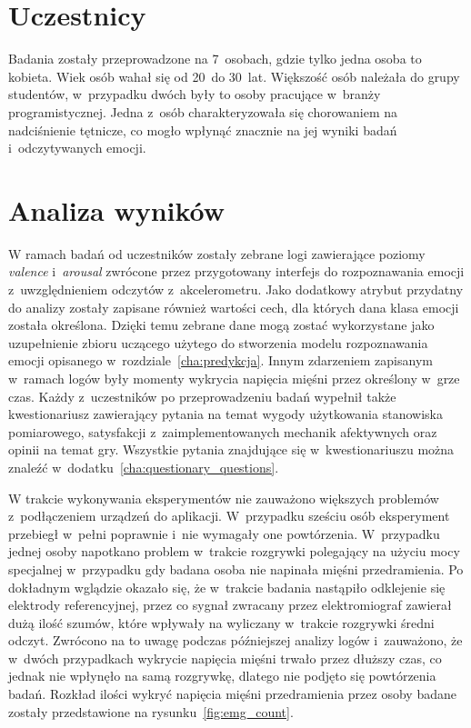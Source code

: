 \section{Uczestnicy}
Badania zostały przeprowadzone na 7~osobach, gdzie tylko jedna osoba to kobieta. Wiek osób wahał się od 20~do 30~lat. Większość osób należała do grupy studentów, w~przypadku dwóch były to osoby pracujące w~branży programistycznej. Jedna z~osób charakteryzowała się chorowaniem na nadciśnienie tętnicze, co mogło wpłynąć znacznie na jej wyniki badań i~odczytywanych emocji.
\section{Analiza wyników}
W ramach badań od uczestników zostały zebrane logi zawierające poziomy \textit{valence} i~\textit{arousal} zwrócone przez przygotowany interfejs do rozpoznawania emocji z~uwzględnieniem odczytów z~akcelerometru. Jako dodatkowy atrybut przydatny do analizy zostały zapisane również wartości cech, dla których dana klasa emocji została określona. Dzięki temu zebrane dane mogą zostać wykorzystane jako uzupełnienie zbioru uczącego użytego do stworzenia modelu rozpoznawania emocji opisanego w~rozdziale~\ref{cha:predykcja}. Innym zdarzeniem zapisanym w~ramach logów były momenty wykrycia napięcia mięśni przez określony w~grze czas. Każdy z~uczestników po przeprowadzeniu badań wypełnił także kwestionariusz zawierający pytania na temat wygody użytkowania stanowiska pomiarowego, satysfakcji z~zaimplementowanych mechanik afektywnych oraz opinii na temat gry. Wszystkie pytania znajdujące się w~kwestionariuszu można znaleźć w~dodatku~\ref{cha:questionary_questions}.

W trakcie wykonywania eksperymentów nie zauważono większych problemów z~podłączeniem urządzeń do aplikacji. W~przypadku sześciu osób eksperyment przebiegł w~pełni poprawnie i~nie wymagały one powtórzenia. W~przypadku jednej osoby napotkano problem w~trakcie rozgrywki polegający na użyciu mocy specjalnej w~przypadku gdy badana osoba nie napinała mięśni przedramienia. Po dokładnym wglądzie okazało się, że w~trakcie badania nastąpiło odklejenie się elektrody referencyjnej, przez co sygnał zwracany przez elektromiograf zawierał dużą ilość szumów, które wpływały na wyliczany w~trakcie rozgrywki średni odczyt. Zwrócono na to uwagę podczas późniejszej analizy logów i~zauważono, że w~dwóch przypadkach wykrycie napięcia mięśni trwało przez dłuższy czas, co jednak nie wpłynęło na samą rozgrywkę, dlatego nie podjęto się powtórzenia badań. Rozkład ilości wykryć napięcia mięśni przedramienia przez osoby badane zostały przedstawione na rysunku~\ref{fig:emg_count}.

